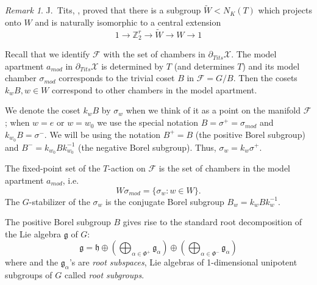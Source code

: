 \documentclass[12pt]{amsbook}%
\theoremstyle{definition}
\theoremstyle{remark}
\newtheorem{rem}[thm]{Remark}
\numberwithin{section}{chapter}
\numberwithin{subsection}{section}
\numberwithin{figure}{chapter}
\def\simod{\sigma_{mod}}
\def\amod{a_{mod}}
\def\bZ{{\mathbb{Z}}}
\def\cF{{\mathscr{F}}}
\def\cX{{\mathscr{X}}}
\def\kap{}
\begin{document}
{{ \begin{rem}
 J.~Tits, \cite{Tits66}, proved that there is a subgroup $\tilde{W}< N_K(T)$ which projects onto $W$ and is naturally isomorphic to a central extension
 $$
1\to \bZ_2^r \to \tilde{W}\to W\to 1
 $$
 \end{rem}
 

Recall that we identify $\cF$ with the set of chambers in $\partial_{Tits}\cX$. The model apartment $\amod$ in $\partial_{Tits}\cX$ is 
determined by $T$ (and determines $T$) and its model chamber $\simod$ corresponds to the trivial coset $B$ in $\cF=G/B$. 
Then the cosets $k_wB, w\in W$ correspond to other chambers in the model apartment. 

We denote the coset $k_wB$ by $\sigma_w$ when we think of it as a point on the manifold $\cF$; when $w=e$ or $w=w_0$ we use the special notation $B=\sigma^+=\simod$ and $k_{w_0}B=\sigma^-$. We will be using the notation $B^+=B$ (the positive Borel subgroup) and $B^-= k_{w_0}B k^{-1}_{w_0}$ (the negative Borel subgroup). Thus, $\sigma_w= k_w \sigma^+$. 
 
 
 The fixed-point set of the $T$-action on $\cF$ is the set of chambers in the model apartment $\amod$, i.e. 
 $$
 W \simod = \{\sigma_w: w\in W\}. 
 $$
The $G$-stabilizer of the $\sigma_w$ is the conjugate Borel subgroup $B_{w}=k_{w} B k_{w}^{-1}$.  
 

The positive Borel subgroup $B$ gives rise to the standard root decomposition of the 
Lie algebra $\mathfrak{g}$ of $G$:
\[\mathfrak{g}=\mathfrak{h}\oplus \left(\bigoplus_{\alpha\in \Phi^+}{\mathfrak g}_{\alpha}\right)\oplus \left(\bigoplus_{\alpha\in \Phi^-}{\mathfrak g}_{\alpha} \right)\]
where %
and the ${\mathfrak g}_{\alpha}$'s are {\em root subspaces}, Lie algebras of 1-dimensional 
unipotent subgroups of $G$ called {\em root subgroups}. 



}}
\end{document}
